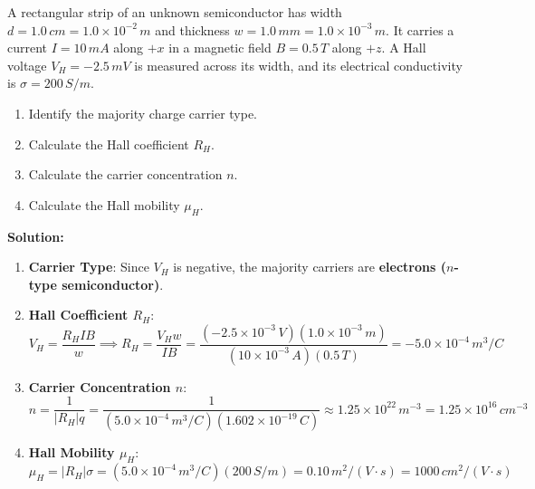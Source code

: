 \begin{example}
A rectangular strip of an unknown semiconductor has width $d = 1.0\,\si{cm} = 1.0 \times 10^{-2}\,\si{m}$ and thickness $w = 1.0\,\si{mm} = 1.0 \times 10^{-3}\,\si{m}$. It carries a current $I = 10\,\si{mA}$ along $+x$ in a magnetic field $B = 0.5\,\si{T}$ along $+z$. A Hall voltage $V_H = -2.5\,\si{mV}$ is measured across its width, and its electrical conductivity is $\sigma = 200\,\si{S/m}$.
\begin{enumerate}
    \item Identify the majority charge carrier type.
    \item Calculate the Hall coefficient $R_H$.
    \item Calculate the carrier concentration $n$.
    \item Calculate the Hall mobility $\mu_H$.
\end{enumerate}

\textbf{Solution:}
\begin{enumerate}
    \item \textbf{Carrier Type}: Since $V_H$ is negative, the majority carriers are \textbf{electrons ($n$-type semiconductor)}.
    
    \item \textbf{Hall Coefficient $R_H$}:
    \begin{equation*}
        V_H = \frac{R_H I B}{w} \implies R_H = \frac{V_H w}{I B} = \frac{(-2.5 \times 10^{-3}\,\si{V})(1.0 \times 10^{-3}\,\si{m})}{(10 \times 10^{-3}\,\si{A})(0.5\,\si{T})} = -5.0 \times 10^{-4}\,\si{m^3/C}
    \end{equation*}
    
    \item \textbf{Carrier Concentration $n$}:
    \begin{equation*}
        n = \frac{1}{|R_H| q} = \frac{1}{(5.0 \times 10^{-4}\,\si{m^3/C})(1.602 \times 10^{-19}\,\si{C})} \approx 1.25 \times 10^{22}\,\si{m^{-3}} = 1.25 \times 10^{16}\,\si{cm^{-3}}
    \end{equation*}
    
    \item \textbf{Hall Mobility $\mu_H$}:
    \begin{equation*}
        \mu_H = |R_H| \sigma = (5.0 \times 10^{-4}\,\si{m^3/C})(200\,\si{S/m}) = 0.10\,\si{m^2/(V\cdot s)} = 1000\,\si{cm^2/(V\cdot s)}
    \end{equation*}
\end{enumerate}
\end{example}

